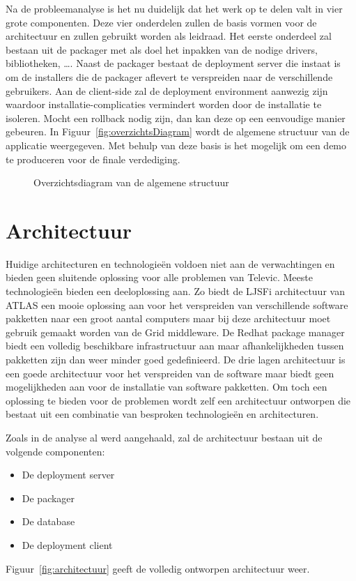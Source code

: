 
Na de probleemanalyse is het nu duidelijk dat het werk op te delen valt in vier grote componenten.
Deze vier onderdelen zullen de basis vormen voor de architectuur en zullen gebruikt worden als leidraad.
Het eerste onderdeel zal bestaan uit de packager met als doel het inpakken van de nodige drivers, bibliotheken, \ldots .
Naast de packager bestaat de deployment server die instaat is om de installers die de packager aflevert te verspreiden naar de verschillende gebruikers.
Aan de client-side zal de deployment environment aanwezig zijn waardoor installatie-complicaties vermindert worden door de installatie te isoleren.
Mocht een rollback nodig zijn, dan kan deze op een eenvoudige manier gebeuren.
In Figuur~\vref{fig:overzichtsDiagram} wordt de algemene structuur van de applicatie weergegeven.
Met behulp van deze basis is het mogelijk om een demo te produceren voor de finale verdediging.

\begin{figure}[!hbt]
\centering
  
  \caption{Overzichtsdiagram van de algemene structuur}
  \label{fig:overzichtsDiagram}
\end{figure}

\section{Architectuur}
Huidige architecturen en technologieën voldoen niet aan de verwachtingen en bieden geen sluitende oplossing voor alle problemen van Televic.
Meeste technologieën bieden een deeloplossing aan.
Zo biedt de LJSFi architectuur van ATLAS een mooie oplossing aan voor het verspreiden van verschillende software pakketten naar een groot aantal computers maar bij deze architectuur moet gebruik gemaakt worden van de Grid middleware.
De Redhat package manager biedt een volledig beschikbare infrastructuur aan maar afhankelijkheden tussen pakketten zijn dan weer minder goed gedefinieerd.
De drie lagen architectuur is een goede architectuur voor het verspreiden van de software maar biedt geen mogelijkheden aan voor de installatie van software pakketten.
Om toch een oplossing te bieden voor de problemen wordt zelf een architectuur ontworpen die bestaat uit een combinatie van besproken technologieën en architecturen.

Zoals in de analyse al werd aangehaald, zal de architectuur bestaan uit de volgende componenten: 
\begin{itemize}
\item De deployment server
\item De packager
\item De database
\item De deployment client
\end{itemize}
Figuur~\vref{fig:architectuur} geeft de volledig ontworpen architectuur weer.

